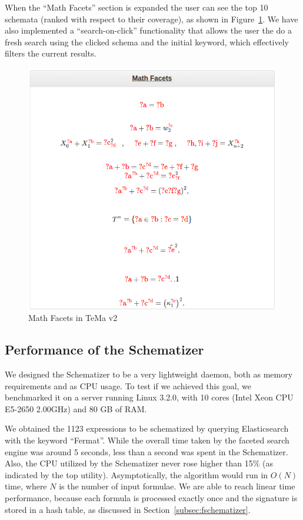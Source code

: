 \documentclass[a4paper,oneside]{article}
\begin{document}
When the ``Math Facets'' section is expanded the user can see the top 10
schemata (ranked with respect to their coverage), as shown in
Figure~\ref{fig:temaV2_facets}. We have also implemented a ``search-on-click''
functionality that allows the user the do a fresh search using the clicked
schema and the initial keyword, which effectively filters the current
results.

\begin{figure}[ht]\centering
    \includegraphics[width=12.1cm]{img/temaV2_facets.png}
    \caption{Math Facets in TeMa v2}\label{fig:temaV2_facets}
\end{figure}
\FloatBarrier


\subsection{Performance of the Schematizer}\label{subsec:sch_performance}
We designed the Schematizer to be a very lightweight daemon, both as memory
requirements and as CPU usage. To test if we achieved this goal, we benchmarked
it on a server running Linux 3.2.0, with 10 cores (Intel Xeon CPU E5-2650
2.00GHz) and 80 GB of RAM. 

We obtained the 1123 expressions to be schematized by querying Elasticsearch
with the keyword ``Fermat''. While the overall time taken by the faceted search
engine was around 5 seconds, less than a second was spent in the Schematizer.
Also, the CPU utilized by the Schematizer never rose higher than 15\% (as
indicated by the \textsf{top} utility). Asymptotically, the algorithm would run
in $O(N)$ time, where $N$ is the number of input formulae. We are able to reach
linear time performance, because each formula is processed exactly once and the
signature is stored in a hash table, as discussed in
Section~\ref{subsec:fschematizer}.
\end{document}
